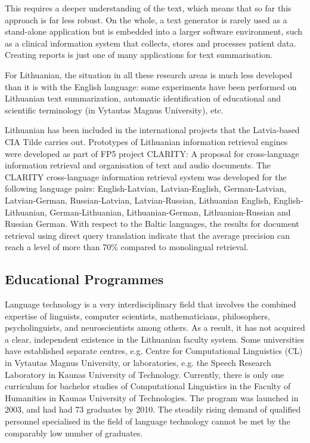 \begin{multicols}{2}
This requires a deeper understanding of the text, which means that so far this approach is far less robust. On the whole, a text generator is rarely used as a stand-alone application but is embedded into a larger software environment, such as a clinical information system that collects, stores and processes patient data. Creating reports is just one of many applications for text summarisation. 

 For Lithuanian, the situation in all these research areas is much less developed than it is with the English language: some experiments have been performed on Lithuanian text summarization, automatic identification of educational and scientific terminology (in Vytautas Magnus University), etc.

Lithuanian has been included in the international projects that the Latvia-based CIA Tilde carries out. Prototypes of Lithuanian information retrieval engines were developed as part of FP5 project CLARITY: A proposal for cross-language information retrieval and organisation of text and audio documents. The CLARITY cross-language information retrieval system was developed for the following language pairs:  English-Latvian, Latvian-English, German-Latvian, Latvian-German, Russian-Latvian, Latvian-Russian, Lithuanian English, English-Lithuanian, German-Lithuanian, Lithuanian-German, Lithuanian-Russian and Russian German. With respect to the Baltic languages, the results for document retrieval using direct query translation indicate that the average precision can reach a level of more than 70\% compared to monolingual retrieval.

\subsection{Educational Programmes}

 Language technology is a very interdisciplinary field that involves the combined expertise of linguists, computer scientists, mathematicians, philosophers, psycholinguists, and neuroscientists among others. As a result, it has not acquired a clear, independent existence in the Lithuanian faculty system. Some universities have established separate centres, e.g. Centre for Computational Linguistics (CL) in Vytautas Magnus University, or laboratories, e.g. the Speech Research Laboratory in Kaunas University of Technology. Currently, there is only one curriculum for bachelor studies of Computational Linguistics in the Faculty of Humanities in Kaunas University of Technologies. The program was launched in 2003, and had had 73 graduates by 2010. The steadily rising demand of qualified personnel specialised in the field of language technology cannot be met by the comparably low number of graduates.


\end{multicols}
